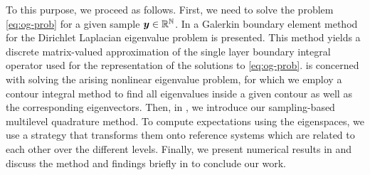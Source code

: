 To this purpose, we proceed as follows.
First, we need to solve the problem \eqref{eq:og-prob} for a given sample ${\boldsymbol y} \in \mathbb{R}^{\mathbb{N}}$.
In  a Galerkin boundary element method for the Dirichlet Laplacian eigenvalue problem is presented.
This method yields a discrete matrix-valued approximation of the single layer boundary integral operator used for the representation of the solutions to \eqref{eq:og-prob}.
 is concerned with solving the arising nonlinear eigenvalue problem, for which we employ a contour integral method to find all eigenvalues inside a given contour as well as the corresponding eigenvectors.
Then, in , we introduce our sampling-based multilevel quadrature method.
To compute expectations using the eigenspaces, we use a strategy that transforms them onto reference systems which are related to each other over the different levels.
Finally, we present numerical results in  and discuss the method and findings briefly in  to conclude our work.

